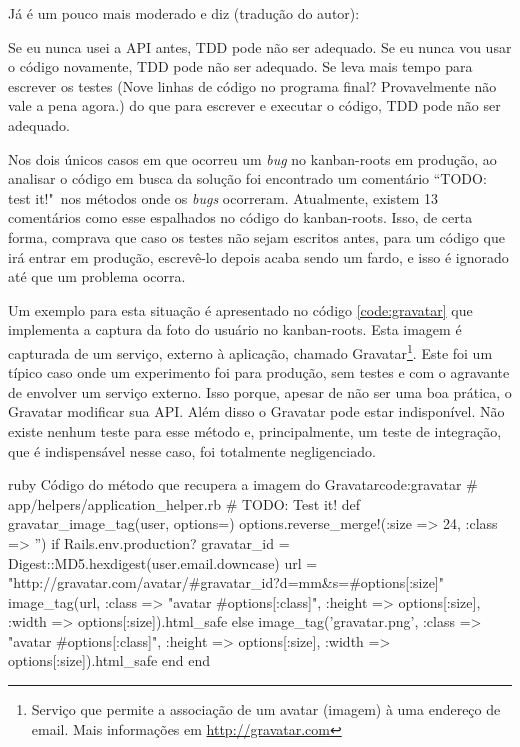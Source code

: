 Já  é um pouco mais moderado e diz (tradução do autor):

\begin{citacao}
Se eu nunca usei a API antes, TDD pode não ser adequado. Se eu nunca vou usar o código novamente, TDD pode não ser adequado. Se leva mais tempo para escrever os testes (Nove linhas de código no programa final? Provavelmente não vale a pena agora.) do que para escrever e executar o código, TDD pode não ser adequado.
\end{citacao}

Nos dois únicos casos em que ocorreu um \textit{bug} no kanban-roots em produção, ao analisar o código em busca da solução foi encontrado um comentário ``TODO: test it!"\ nos métodos onde os \textit{bugs} ocorreram. Atualmente, existem 13 comentários como esse espalhados no código do kanban-roots. Isso, de certa forma, comprava que caso os testes não sejam escritos antes, para um código que irá entrar em produção, escrevê-lo depois acaba sendo um fardo, e isso é ignorado até que um problema ocorra.

Um exemplo para esta situação é apresentado no código \ref{code:gravatar} que implementa a captura da foto do usuário no kanban-roots. Esta imagem é capturada de um serviço, externo à aplicação, chamado Gravatar\footnote{Serviço que permite a associação de um avatar (imagem) à uma endereço de email. Mais informações em \url{http://gravatar.com}}. Este foi um típico caso onde um experimento foi para produção, sem testes e com o agravante de envolver um serviço externo. Isso porque, apesar de não ser uma boa prática, o Gravatar modificar sua API. Além disso o Gravatar pode estar indisponível. Não existe nenhum teste para esse método e, principalmente, um teste de integração, que é indispensável nesse caso, foi totalmente negligenciado.

\begin{mycode}{ruby}%
{Código do método que recupera a imagem do Gravatar}{code:gravatar}
# app/helpers/application_helper.rb
# TODO: Test it!
def gravatar_image_tag(user, options={})
  options.reverse_merge!(:size => 24, :class => '')
  if Rails.env.production?
    gravatar_id = Digest::MD5.hexdigest(user.email.downcase)
    url = "http://gravatar.com/avatar/#{gravatar_id}?d=mm&s=#{options[:size]}"
    image_tag(url,
              :class => "avatar #{options[:class]}",
              :height => options[:size],
              :width => options[:size]).html_safe
  else
    image_tag('gravatar.png',
              :class => "avatar #{options[:class]}",
              :height => options[:size],
              :width => options[:size]).html_safe
  end
end
\end{mycode}

